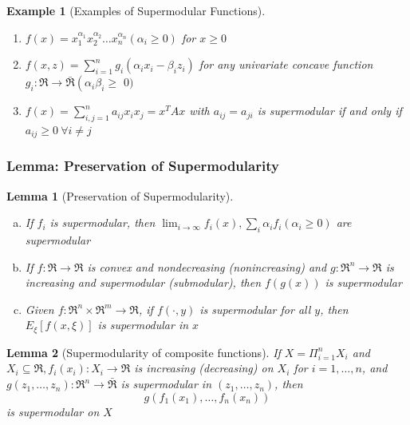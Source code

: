 \documentclass[11pt,a4paper]{article}
\newtheorem{lemma}{Lemma}
\newtheorem{example}{Example}
\begin{document}
\begin{example}[Examples of Supermodular Functions]
    \quad

\begin{enumerate}
    \item $f(x)=x_{1}^{\alpha_{1}} x_{2}^{\alpha_{2}} \ldots x_{n}^{\alpha_{n}}\left(\alpha_{i} \geq 0\right)$ for $x \geq 0$
    \item $f(x, z)=\sum_{i=1}^{n} g_{i}\left(\alpha_{i} x_{i}-\beta_{i} z_{i}\right)$ for any univariate concave function $g_{i}: \Re \rightarrow \bar{\Re}\left(\alpha_{i} \beta_{i} \geq\right.$ $0)$
    \item $f(x)=\sum_{i, j=1}^{n} a_{i j} x_{i} x_{j}=x^TAx$ with $a_{i j}=a_{j i}$ is supermodular if and only if $a_{i j} \geq 0\ \forall i \neq j$
\end{enumerate}
\end{example}

\subsubsection{Lemma: Preservation of Supermodularity}
\begin{lemma}[Preservation of Supermodularity]
\quad

\begin{enumerate}[a)]
    \item If $f_{i}$ is supermodular, then $\lim _{i \rightarrow \infty} f_{i}(x), \sum_{i} \alpha_{i} f_{i}\left(\alpha_{i} \geq 0\right)$ are supermodular
    \item If $f: \Re \rightarrow \Re$ is convex and nondecreasing (nonincreasing) and $g: \Re^{n} \rightarrow \Re$ is increasing and supermodular (submodular), then $f(g(x))$ is supermodular
    \item Given $f: \Re^{n} \times \Re^{m} \rightarrow \Re$, if $f(\cdot, y)$ is supermodular for all $y$, then $E_{\xi}[f(x, \xi)]$ is supermodular in $x$
\end{enumerate}
\end{lemma}

\begin{lemma}[Supermodularity of composite functions]
    \quad

    If $X=\Pi_{i=1}^{n} X_{i}$ and $X_{i} \subseteq \Re, f_{i}\left(x_{i}\right): X_{i} \rightarrow \Re$ is increasing (decreasing) on $X_{i}$ for $i=1, \ldots, n$, and $g\left(z_{1}, \ldots, z_{n}\right): \Re^{n} \rightarrow \bar{\Re}$ is supermodular in $\left(z_{1}, \ldots, z_{n}\right)$, then
$$
g\left(f_{1}\left(x_{1}\right), \ldots, f_{n}\left(x_{n}\right)\right)
$$
is supermodular on $X$
\end{lemma}
\end{document}
